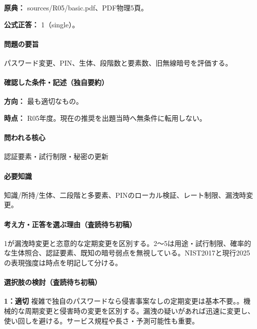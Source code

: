 \noindent\textbf{原典：} sources/R05/basic.pdf、PDF物理5頁。

\textbf{公式正答：} 1（single）。

\paragraph{問題の要旨} パスワード変更、PIN、生体、段階数と要素数、旧無線暗号を評価する。

\paragraph{確認した条件・記述（独自要約）}\mbox{}\par

\noindent\textbf{方向：} 最も適切なもの。\par

\noindent\textbf{時点：} R05年度。現在の推奨を出題当時へ無条件に転用しない。\par

\paragraph{問われる核心} 認証要素・試行制限・秘密の更新

\paragraph{必要知識} 知識/所持/生体、二段階と多要素、PINのローカル検証、レート制限、漏洩時変更。

\paragraph{考え方・正答を選ぶ理由（査読待ち初稿）} 1が漏洩時変更と恣意的な定期変更を区別する。2〜5は用途・試行制限、確率的な生体照合、認証要素、既知の暗号弱点を無視している。NIST2017と現行2025の表現強度は時点を明記して分ける。

\paragraph{選択肢の検討（査読待ち初稿）}\mbox{}\par

\noindent\textbf{1：適切} 複雑で独自のパスワードなら侵害事案なしの定期変更は基本不要。。機械的な周期変更と侵害時の変更を区別する。漏洩の疑いがあれば迅速に変更し、使い回しを避ける。サービス規程や長さ・予測可能性も重要。\par

